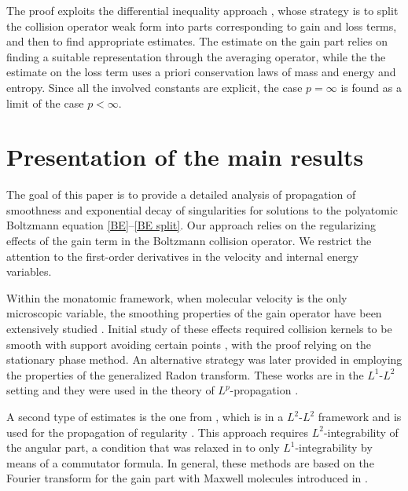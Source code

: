 \documentclass[11pt,a4paper]{amsart}
\begin{document}
The proof exploits the differential inequality approach \cite{MV}, whose strategy is to split the collision operator weak form into parts corresponding to   gain and   loss terms, and then to find appropriate estimates.  The estimate on the gain part relies on finding a suitable representation through the averaging operator, while the the estimate on the loss term uses a priori conservation laws of mass and energy and entropy. Since all the involved constants are explicit,  the case $p = \infty$  is found as a limit of the case $p < \infty$. 

 



\section{Presentation of the main results}\label{Sec: main}


The goal of this paper is to provide a detailed analysis of propagation of smoothness and exponential decay of singularities for solutions to the polyatomic Boltzmann equation \eqref{BE}--\eqref{BE split}. Our approach relies on the regularizing effects of the gain term in the Boltzmann collision operator. We restrict the attention to the first-order derivatives in the velocity and internal energy variables.

Within the monatomic framework, when molecular velocity is the only microscopic variable, the smoothing properties of the gain operator have been extensively studied \cite{L, W, BD, LU, MV,LD-Parma}. Initial study of these   effects required collision kernels to be smooth with support avoiding certain points \cite{L}, with the proof relying on the stationary phase method. An alternative strategy was  later provided in \cite{W}  employing the properties of the generalized Radon transform. These works  are in the $L^1$-$L^2$ setting and they were used in the theory of $L^p$-propagation \cite{MV}. 

A second type of estimates is the one from  \cite{BD}, which is in a $L^2$-$L^2$ framework and is used for the propagation of regularity \cite{MV}. This approach requires $L^2$-integrability of the angular part,  a condition that was relaxed in \cite{AGT} to only $L^1$-integrability by means of a commutator formula. In general, these methods are based   on  the Fourier transform for the gain part with Maxwell molecules introduced in \cite{Bob-Exact-solutions-Fourier}. 


 
\end{document}
